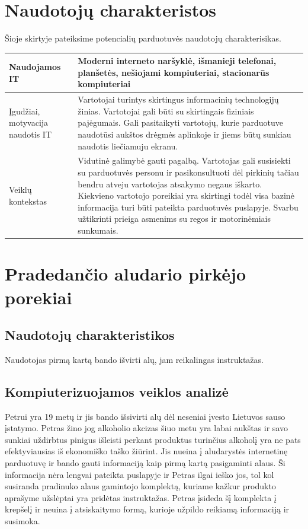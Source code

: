 \documentclass[oneside]{VUMIFPSkursinis}
\begin{document}
\section{Naudotojų charakteristos}
Šioje skirtyje pateiksime potencialių parduotuvės naudotojų charakterisikas.

\begin{center}
\begin{tabular}{ | m{7em} | m{15cm}| }
\hline
Naudojamos IT & Moderni interneto naršyklė, išmanieji telefonai, planšetės, nešiojami kompiuteriai, stacionarūs kompiuteriai  \\
\hline
Įgudžiai, motyvacija naudotis IT & Vartotojai turintys skirtingus informacinių technologijų žinias. Vartotojai gali būti su skirtingais fiziniais pajėgumais.
Gali pasitaikyti vartotojų, kurie parduotuve naudotūsi aukštos drėgmės aplinkoje ir jiems būtų sunkiau naudotis liečiamuju ekranu.  \\
\hline
Veiklų kontekstas & Vidutinė galimybė gauti pagalbą.
Vartotojas gali susisiekti su parduotuvės personu ir pasikonsultuoti dėl pirkinių tačiau bendru atveju vartotojas atsakymo negaus iškarto.
Kiekvieno vartotojo poreikiai yra skirtingi todėl visa bazinė informacija turi būti pateikta parduotuvės puslapyje.
Svarbu užtikrinti prieiga asmenims su regos ir motorinėmiais sunkumais. \\
\hline
\end{tabular}
\end{center}
\section{Pradedančio aludario pirkėjo porekiai}
	\subsection{Naudotojų charakteristikos}
		Naudotojas pirmą kartą bando išvirti alų, jam reikalingas instruktažas.
	\subsection{Kompiuterizuojamos veiklos analizė}
		Petrui yra 19 metų ir jis bando išsivirti alų dėl neseniai įvesto Lietuvos sauso įstatymo.
		Petras žino jog alkoholio akcizas šiuo metu yra labai aukštas ir savo sunkiai uždirbtus pinigus išleisti perkant produktus turinčius alkoholį yra ne pats efektyviausias iš ekonomiško taško žiūrint.
		Jis nueina į aludarystės internetinę parduotuvę ir bando gauti informaciją kaip pirmą kartą pasigaminti alaus.
		Ši informacija nėra lengvai pateikta puslapyje ir Petras ilgai ieško jos, tol kol susiranda pradinuko alaus gamintojo komplektą, kuriame kažkur produkto aprašyme užslėptai yra pridėtas instruktažas.
		Petras įsideda šį komplekta į krepšelį ir neuina į atsiskaitymo formą, kurioje užpildo reikiamą informaciją ir susimoka.
\end{document}
